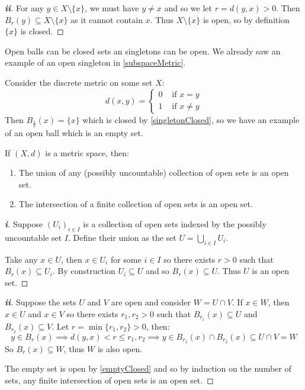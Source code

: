 \documentclass[../main.tex]{subfiles}
\begin{document}
\begin{proof}[\textbf{ii}]
  For any $y \in X \setminus \{x\}$, we must have $y \neq x$ and so we let $r = d(y, x) > 0$.
  Then $B_r(y) \subseteq X \setminus \{x\}$ as it cannot contain $x$.
  Thus $X \setminus \{x\}$ is open, so by definition $\{x\}$ is closed.
\end{proof}
\begin{remark}[Warning]
  Open balls can be closed sets an singletons can be open.
  We already saw an example of an open singleton in \cref{subspaceMetric}.

  Consider the discrete metric on some set $X$:
  \[
    d(x, y) = \begin{cases}
    0 & \text{ if } x = y \\
    1 & \text{ if } x \neq y
    \end{cases}
  \]
  Then $B_{\frac{1}{2}}(x) = \{x\}$ which is closed by \cref{singletonClosed}, so we have an example of an open ball which is an empty set.
\end{remark}
\begin{theorem}
  If $(X, d)$ is a metric space, then: \label{unionProp}
  \begin{enumerate}
    \item The union of any (possibly uncountable) collection of open sets is an open set.
    \item The intersection of a finite collection of open sets is an open set.
  \end{enumerate}
\end{theorem}
\begin{proof}[\textbf{i}]
  Suppose $(U_i)_{i \in I}$ is a collection of open sets indexed by the possibly uncountable set $I$.
  Define their union as the set $U = \bigcup_{i \in I} U_i$.

  Take any $x \in U$, then $x \in U_i$ for some $i \in I$ so there exists $r > 0$ such that $B_r(x) \subseteq U_i$.
  By construction $U_i \subseteq U$ and so $B_r(x) \subseteq U$.
  Thus $U$ is an open set.
\end{proof}
\begin{proof}[\textbf{ii}]
  Suppose the sets $U$ and $V$ are open and consider $W = U \cap V$.
  If $x \in W$, then $x \in U$ and $x \in V$ so there exists $r_1, r_2 > 0$ such that $B_{r_1}(x) \subseteq U$ and $B_{r_2}(x) \subseteq V$.
  Let $r = \min\{r_1, r_2\} > 0$, then:
  \[
    y \in B_r(x) \implies d(y, x) < r \leq r_1, r_2 \implies y \in B_{r_1}(x) \cap B_{r_2}(x) \subseteq U \cap V = W
  \]
  So $B_r(x) \subseteq W$, thus $W$ is also open.

  The empty set is open by \cref{emptyClosed} and so by induction on the number of sets, any finite intersection of open sets is an open set.
\end{proof}
\end{document}
